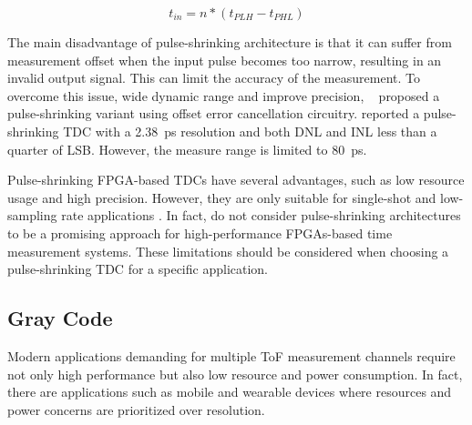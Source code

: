 \begin{equation}
	t_{in} = n * (t_{PLH} - t_{PHL})
	\label{eq:pulse_shrinking_measure}
\end{equation}


The main disadvantage of pulse-shrinking architecture is that it can suffer from measurement offset when the input pulse becomes too narrow, resulting in an invalid output signal. This can limit the accuracy of the measurement. To overcome this issue, wide dynamic range and improve precision, ~\citet{pulse_shrinking_offset} proposed a pulse-shrinking variant using offset error cancellation circuitry. \citet{pulse_shrinking} reported a pulse-shrinking \gls{TDC} with a 2.38~ps resolution and both \gls{DNL} and \gls{INL} less than a quarter of \gls{LSB}. However, the measure range is limited to 80~ps.

Pulse-shrinking \gls{FPGA}-based \glspl{TDC} have several advantages, such as low resource usage and high precision. However, they are only suitable for single-shot and low-sampling rate applications \citep{mattada_ov}. In fact, \citet{machado_ov} do not consider pulse-shrinking architectures to be a promising approach for high-performance \glspl{FPGA}-based time measurement systems. These limitations should be considered when choosing a pulse-shrinking \gls{TDC} for a specific application.


\subsection{Gray Code} %

Modern applications demanding for multiple \gls{ToF} measurement channels require not only high performance but also low resource and power consumption. In fact, there are applications such as mobile and wearable devices where resources and power concerns are prioritized over resolution.

